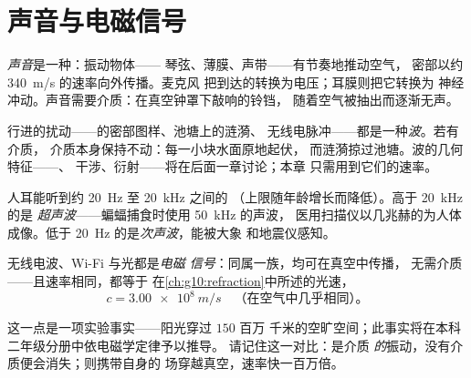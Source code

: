 \section{声音与电磁信号}

\begin{definition}[声音]\label{def:g10:signals-and-waves:sound}
\emph{声音}是一种：振动物体——
琴弦、薄膜、声带——有节奏地推动空气，
密部以约 \qty{340}{m/s} 的速率向外传播。麦克风
把到达的转换为电压；耳膜则把它转换为
神经冲动。声音需要介质：在真空钟罩下敲响的铃铛，
随着空气被抽出而逐渐无声。
\end{definition}

\begin{definition}[波]\label{def:g10:signals-and-waves:wave}
行进的扰动——的密部图样、池塘上的涟漪、
无线电脉冲——都是一种\emph{波}。若有介质，
介质本身保持不动：每一小块水面原地起伏，
而涟漪掠过池塘。波的几何特征——、
干涉、衍射——将在后面一章讨论；本章
只需用到它们的速率。
\end{definition}

\begin{definition}[超声波与次声波]\label{def:g10:signals-and-waves:ultrasound}
人耳能听到约 \qty{20}{Hz} 至 \qty{20}{kHz} 之间的
（上限随年龄增长而降低）。高于 \qty{20}{kHz} 的是
\emph{超声波}——蝙蝠捕食时使用 \qty{50}{kHz} 的声波，
医用扫描仪以几兆赫的为人体成像。低于
\qty{20}{Hz} 的是\emph{次声波}，能被大象
和地震仪感知。
\end{definition}

\begin{proposition}[电磁信号]\label{prop:g10:signals-and-waves:em}
无线电波、Wi-Fi 与光都是\emph{电磁
信号}：同属一族，均可在真空中传播，
无需介质——且速率相同，都等于
在\cref{ch:g10:refraction}中所述的光速，
\[
c = \qty{3.00e8}{m/s} \quad \text{（在空气中几乎相同）。}
\]
\end{proposition}
\admitted

\begin{remark}\label{rem:g10:signals-and-waves:honest}
这一点是一项实验事实——阳光穿过 $150$ 百万
千米的空旷空间；此事实将在本科二年级分册中依电磁学定律予以推导。
请记住这一对比：是介质
\emph{的}振动，没有介质便会消失；则携带自身的
场穿越真空，速率快一百万倍。
\end{remark}

